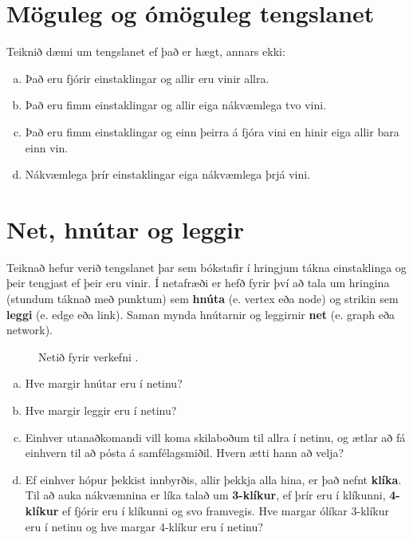 \documentclass[b5paper,12pt]{book}
\renewcommand*\thesection{\arabic{section}}
\begin{document}
\section{Möguleg og ómöguleg tengslanet}
Teiknið dæmi um tengslanet ef það er hægt, annars ekki:
\begin{enumerate}[(a)]
    \item Það eru fjórir einstaklingar og allir eru vinir allra. 
    \item Það eru fimm einstaklingar og allir eiga nákvæmlega tvo vini.
    \item Það eru fimm einstaklingar og einn þeirra á fjóra vini en hinir eiga allir bara einn vin.
    \item Nákvæmlega þrír einstaklingar eiga nákvæmlega þrjá vini.
\end{enumerate}

\section{Net, hnútar og leggir}
Teiknað hefur verið tengslanet þar sem bókstafir í hringjum tákna einstaklinga og þeir tengjast ef þeir eru vinir. Í netafræði er hefð fyrir því að tala um hringina (stundum táknað með punktum) sem \textbf{hnúta} (e. vertex eða node) og strikin sem \textbf{leggi} (e. edge eða link). Saman mynda hnútarnir og leggirnir \textbf{net} (e. graph eða network). 
\begin{figure}[h]
    \centering
{}
\caption*{Netið fyrir verkefni \thesection{}.}
\end{figure}

\begin{enumerate}[(a)]
    \item Hve margir hnútar eru í netinu?
    \item Hve margir leggir eru í netinu?
    \item Einhver utanaðkomandi vill koma skilaboðum til allra í netinu, og ætlar að fá einhvern til að pósta á samfélagsmiðil. Hvern ætti hann að velja? 
    \item Ef einhver hópur þekkist innbyrðis, allir þekkja alla hina, er það nefnt \textbf{klíka}. Til að auka nákvæmnina er líka talað um \textbf{3-klíkur}, ef þrír eru í klíkunni, \textbf{4-klíkur} ef fjórir eru í klíkunni og svo framvegis. Hve margar ólíkar 3-klíkur eru í netinu og hve margar 4-klíkur eru í netinu?
\end{enumerate}
\end{document}
